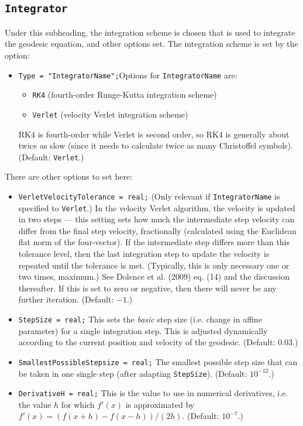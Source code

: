 \documentclass[11pt,a4paper]{article}
\newcommand{\code}[1]{{\tt #1}}
\begin{document}
\subsection{\code{Integrator}}
Under this subheading, the integration scheme is chosen that is used to integrate the geodesic equation, and other options set. The integration scheme is set by the option:
\begin{itemize}
 \item \code{Type = "IntegratorName";}\newline Options for \code{IntegratorName} are:
 \begin{itemize}
 \item \code{RK4} (fourth-order Runge-Kutta integration scheme)
 \item \code{Verlet} (velocity Verlet integration scheme)
 \end{itemize}
 RK4 is fourth-order while Verlet is second order, so RK4 is generally about twice as slow (since it needs to calculate twice as many Christoffel symbols). (Default: \code{Verlet}.)
 \end{itemize}
There are other options to set here:
\begin{itemize}
\item \code{VerletVelocityTolerance = real;} \newline (Only relevant if \code{IntegratorName} is specified to \code{Verlet}.) In the velocity Verlet algorithm, the velocity is updated in two steps --- this setting sets how much the intermediate step velocity can differ from the final step velocity, fractionally (calculated using the Euclidean flat norm of the four-vector). If the intermediate step differs more than this tolerance level, then the last integration step to update the velocity is repeated until the tolerance is met. (Typically, this is only necessary one or two times, maximum.) See Dolence et al. (2009) eq. (14) and the discussion thereafter. If this is set to zero or negative, then there will never be any further iteration. (Default: $-1$.)
 \item \code{StepSize = real;} \newline This sets the \emph{basic} step size (i.e. change in affine parameter) for a single integration step. This is adjusted dynamically according to the current position and velocity of the geodesic. (Default: 0.03.)
  \item \code{SmallestPossibleStepsize = real;} \newline The smallest possible step size that can be taken in one single step (after adapting \code{StepSize}). (Default: $10^{-12}$.)
 \item \code{DerivativeH = real;} \newline This is the value to use in numerical derivatives, i.e. the value $h$ for which $f'(x)$ is approximated by $f'(x) = (f(x+h)-f(x-h))/(2h)$. (Default: $10^{-7}$.)
\end{itemize}
\end{document}
